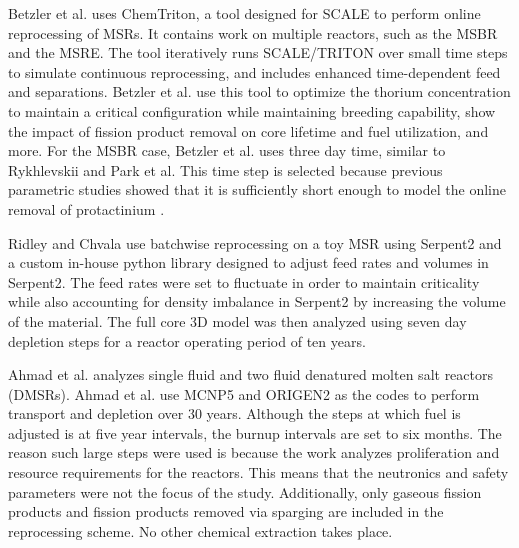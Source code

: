 Betzler et al. \cite{betzler_molten_2017} uses ChemTriton, a tool designed for SCALE to perform online reprocessing of MSRs. It contains work on multiple reactors, such as the MSBR and the MSRE. The tool iteratively runs SCALE/TRITON over small time steps to simulate continuous reprocessing, and includes enhanced time-dependent feed and separations.
Betzler et al. use this tool to optimize the thorium concentration to maintain a critical configuration while maintaining breeding capability, show the impact of fission product removal on core lifetime and fuel utilization, and more.
For the MSBR case, Betzler et al. uses three day time, similar to Rykhlevskii and Park et al. 
This time step is selected because previous parametric studies showed that it is sufficiently short enough to model the online removal of protactinium \cite{powers_new_2013}.

Ridley and Chvala \cite{ridley_method_2017} use batchwise reprocessing on a toy MSR using Serpent2 and a custom in-house python library designed to adjust feed rates and volumes in Serpent2. The feed rates were set to fluctuate in order to maintain criticality while also accounting for density imbalance in Serpent2 by increasing the volume of the material. The full core 3D model was then analyzed using seven day depletion steps for a reactor operating period of ten years.

Ahmad et al. \cite{ahmad_neutronics_2015} analyzes single fluid and two fluid denatured molten salt reactors (DMSRs). Ahmad et al. use MCNP5 and ORIGEN2 as the codes to perform transport and depletion over 30 years. Although the steps at which fuel is adjusted is at five year intervals, the burnup intervals are set to six months. The reason such large steps were used is because the work analyzes proliferation and resource requirements for the reactors. This means that the neutronics and safety parameters were not the focus of the study. Additionally, only gaseous fission products and fission products removed via sparging are included in the reprocessing scheme. No other chemical extraction takes place.

